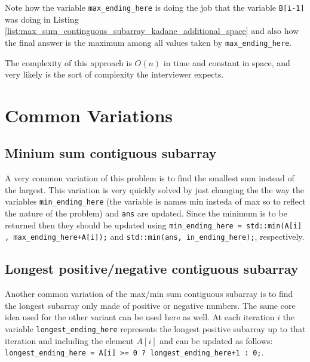 Note how the variable \texttt{max\_ending\_here} is doing the job that the variable \texttt{B[i-1]} was doing in Listing \ref{list:max_sum_continguous_subarray_kadane_additional_space} and also how the final answer is the maximum among all values taken by \texttt{max\_ending\_here}.

The complexity of this approach is $O(n)$ in time and constant in space, and very likely is the sort of complexity the interviewer expects. 

\section{Common Variations}
\subsection{Minium sum contiguous subarray}
A very common variation of this problem is to find the smallest sum instead of the largest. This variation is very quickly solved by just changing the the way the variables \texttt{min\_ending\_here} (the variable is names min insteda of max so to reflect the nature of the problem) and \texttt{ans} are updated. Since the minimum is to be returned then they should be updated using \lstinline[columns=fixed]{min_ending_here = std::min(A[i] , max_ending_here+A[i]);}  and \lstinline[columns=fixed]{std::min(ans, in_ending_here);}, respectively.  

\subsection{Longest positive/negative contiguous subarray}
Another common variation of the max/min sum contiguous subarray is to find the longest subarray only made of positive or negative numbers. The same core idea used for the other variant can be used here as well. At each iteration $i$ the variable \texttt{longest\_ending\_here} represents the longest positive subarray up to that iteration and including the element $A[i]$ and can be updated as follows: \lstinline[columns=fixed]{longest_ending_here = A[i] >= 0 ? longest_ending_here+1 : 0;}.